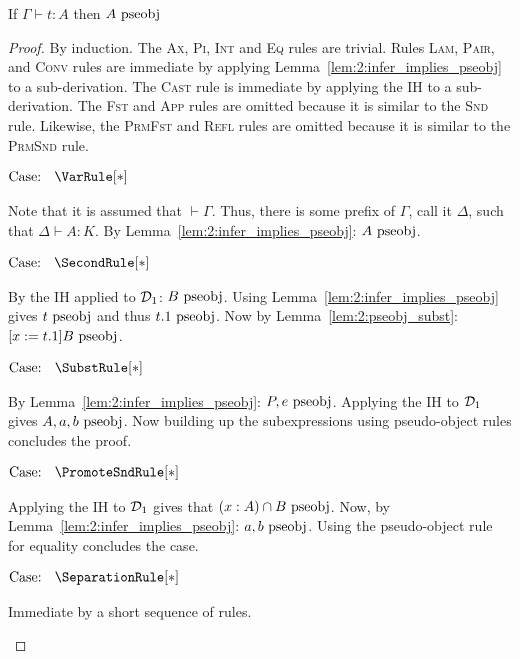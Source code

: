 \begin{lemma}
    If $\Gamma \vdash t : A$ then $A~\textnormal{pseobj}$
    \label{lem:2:infer_implies_pseobj_type}
\end{lemma}
\begin{proof}
    By induction.
    The \textsc{Ax}, \textsc{Pi}, \textsc{Int} and \textsc{Eq} rules are trivial.
    Rules \textsc{Lam}, \textsc{Pair}, and \textsc{Conv} rules are immediate by applying Lemma~\ref{lem:2:infer_implies_pseobj} to a sub-derivation.
    The \textsc{Cast} rule is immediate by applying the IH to a sub-derivation.
    The \textsc{Fst} and \textsc{App} rules are omitted because it is similar to the \textsc{Snd} rule.
    Likewise, the \textsc{PrmFst} and \textsc{Refl} rules are omitted because it is similar to the \textsc{PrmSnd} rule.

    $\text{Case: }\begin{array}{c} \VarRule[*] \end{array}$
    \begin{proofcase}
        Note that it is assumed that $\vdash \Gamma$.
        Thus, there is some prefix of $\Gamma$, call it $\Delta$, such that $\Delta \vdash A : K$.
        By Lemma~\ref{lem:2:infer_implies_pseobj}: $A~\textnormal{pseobj}$.
    \end{proofcase}

    $\text{Case: }\begin{array}{c} \SecondRule[*] \end{array}$
    \begin{proofcase}
        By the IH applied to $\mathcal{D}_{1}$: $B~\textnormal{pseobj}$.
        Using Lemma~\ref{lem:2:infer_implies_pseobj} gives $t~\textnormal{pseobj}$ and thus $t.1~\textnormal{pseobj}$.
        Now by Lemma~\ref{lem:2:pseobj_subst}: $[x := t.1]B~\textnormal{pseobj}$.
    \end{proofcase}

    $\text{Case: }\begin{array}{c} \SubstRule[*] \end{array}$
    \begin{proofcase}
        By Lemma~\ref{lem:2:infer_implies_pseobj}: $P, e~\textnormal{pseobj}$.
        Applying the IH to $\mathcal{D}_{1}$ gives $A, a, b~\textnormal{pseobj}$.
        Now building up the subexpressions using pseudo-object rules concludes the proof.
    \end{proofcase}

    $\text{Case: }\begin{array}{c} \PromoteSndRule[*] \end{array}$
    \begin{proofcase}
        Applying the IH to $\mathcal{D}_{1}$ gives that $(x : A) \cap B~\textnormal{pseobj}$.
        Now, by Lemma~\ref{lem:2:infer_implies_pseobj}: $a, b~\textnormal{pseobj}$.
        Using the pseudo-object rule for equality concludes the case.
    \end{proofcase}

    $\text{Case: }\begin{array}{c} \SeparationRule[*] \end{array}$
    \begin{proofcase}
        Immediate by a short sequence of \pseobj rules.
    \end{proofcase}
\end{proof}

